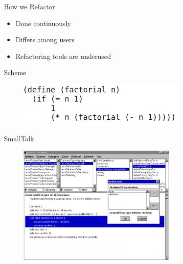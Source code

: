 \documentclass[xcolor=dvipsnames, 14pt]{beamer}
\begin{document}
\begin{frame}{How we Refactor}
  \begin{itemize}
  \setlength\itemsep{2em}
  \item {
  Done continuously
  }
  \item {
    Differs among users
  }
  \item {
    Refactoring tools are underused
  }
  \end{itemize}
\end{frame}
\begin{frame}{Scheme}
    \begin{figure}[htbp]
      \centering
      \includegraphics[width=0.75\textwidth]{img/SchemeCode2.png}
      \label{fig:Scheme}
    \end{figure}
\end{frame}

\begin{frame}{SmallTalk}
  \begin{figure}[htbp]
    \centering
    \includegraphics[width=0.7\textwidth]{img/smalltalk.png}
    \label{fig:Smalltalk}
  \end{figure}
\end{frame}
\end{document}
